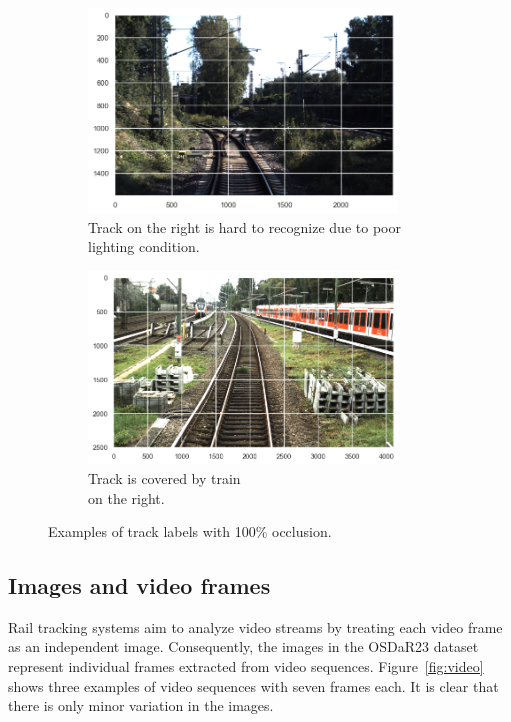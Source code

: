 \documentclass[Master,MDS,english]{BASE/twbook} %
\begin{document}
\begin{figure}[h]
\centering
\begin{subfigure}[t]{.5\textwidth}
  \centering
  \includegraphics[width=0.9\textwidth]{images/datasets/db/occlusion_example1}
  \caption{Track on the right is hard to recognize due to poor lighting condition.}
\end{subfigure}%
\begin{subfigure}[t]{.5\textwidth}
  \centering
  \includegraphics[width=0.9\textwidth]{images/datasets/db/occlusion_example2}
  \caption{Track is covered by train \\ on the right. }
\end{subfigure}
\caption{Examples of track labels with 100\% occlusion.}
\label{fig:occlusion_examples}
\end{figure}


\subsection{Images and video frames}

Rail tracking systems aim to analyze video streams by treating each video frame as an independent image. Consequently, the images in the OSDaR23 dataset represent individual frames extracted from video sequences. 	Figure~\ref{fig:video} shows three examples of video sequences with seven frames each. It is clear that there is only minor variation in the images.
\end{document}
